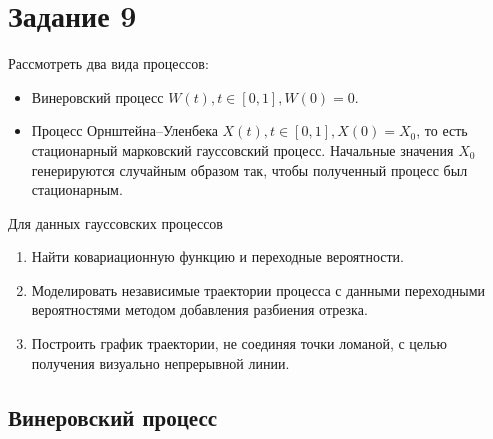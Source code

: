 
\section{Задание 9}

Рассмотреть два вида процессов:
\begin{itemize}
	\item Винеровский процесс $W(t), t \in [0,1], W(0) = 0$.
	\item Процесс Орнштейна--Уленбека $X(t), t \in [0,1], X(0) = X_0$, то есть 
    стационарный марковский гауссовский процесс. Начальные значения $X_0$ 
    генерируются случайным образом так, чтобы полученный процесс был 
    стационарным.
\end{itemize}

Для данных гауссовских процессов
\begin{enumerate}
	\item Найти ковариационную функцию и переходные вероятности.
	\item Моделировать независимые траектории процесса с данными переходными 
    вероятностями методом добавления разбиения отрезка.
	\item Построить график траектории, не соединяя точки ломаной, с целью 
    получения визуально непрерывной линии.
\end{enumerate}

\subsection{Винеровский процесс}

